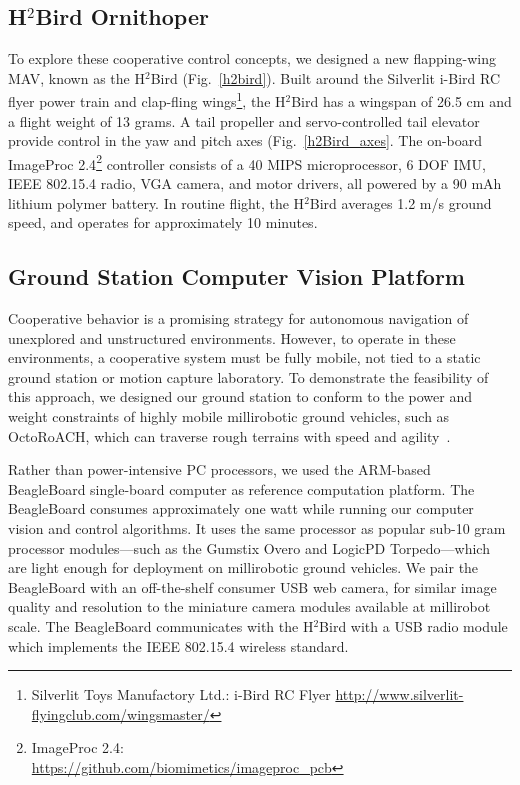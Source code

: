\documentclass{aamas2013}
\begin{document}
\subsection{H$^2$Bird Ornithoper}
To explore these cooperative control concepts, we designed a new flapping-wing MAV, known as the H$^2$Bird (Fig.~\ref{h2bird}). Built around the Silverlit i-Bird 
RC flyer power train and clap-fling 
wings\footnote{\raggedright Silverlit Toys Manufactory Ltd.: i-Bird RC Flyer
\href{http://www.silverlit-flyingclub.com/wingsmaster/}
     {http://www.silverlit-flyingclub.com/wingsmaster/}}, 
the H$^2$Bird has a wingspan of 26.5 cm and a flight weight of 13 grams. A 
tail propeller and servo-controlled tail elevator provide control in the yaw 
and pitch axes (Fig.~\ref{h2Bird_axes}. The on-board ImageProc 2.4\footnote{ImageProc 2.4: \\
\href{https://github.com/biomimetics/imageproc\_pcb}
     {https://github.com/biomimetics/imageproc\_pcb}} 
controller consists of a 40 MIPS microprocessor, 6 DOF IMU, 
IEEE 802.15.4 radio, VGA camera, and motor drivers, all powered by a 90 mAh 
lithium polymer battery. In routine flight, the H$^2$Bird averages 1.2 m/s 
ground speed, and operates for approximately 10 minutes.

\subsection{Ground Station Computer Vision Platform}
Cooperative behavior is a promising strategy for autonomous navigation of 
unexplored and unstructured environments. However, to operate in these environments,
a cooperative system must be fully mobile, not tied to a static ground station or 
motion capture laboratory. To demonstrate the feasibility of this approach, 
we designed our ground station to conform to the power and weight 
constraints of highly mobile millirobotic ground vehicles, such as 
OctoRoACH, which can traverse rough terrains with speed and agility~\cite{Pullin2012Dynamic}. 

Rather than power-intensive PC processors, we used the ARM-based 
BeagleBoard single-board computer as reference computation platform. The
BeagleBoard consumes approximately one watt while running our computer vision 
and control algorithms. It uses the same processor as popular sub-10 gram 
processor modules---such as the Gumstix Overo and LogicPD Torpedo---which are 
light enough for deployment on millirobotic ground vehicles. We pair the 
BeagleBoard with an off-the-shelf consumer USB web camera, for similar image 
quality and resolution to the miniature camera modules available at 
millirobot scale. The BeagleBoard communicates with the H$^2$Bird with a
USB radio module which implements the IEEE 802.15.4 wireless standard.
\end{document}
